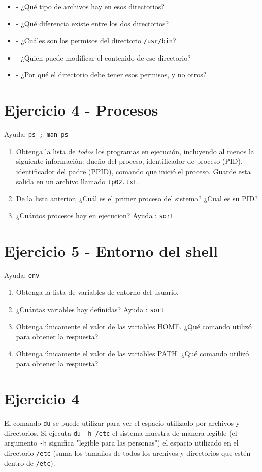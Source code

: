 \documentclass[12pt]{article}
\begin{document}
\begin{itemize}
\item - ¿Qué tipo de archivos hay en esos directorios?
\item - ¿Qué diferencia existe entre los dos directorios?
\item - ¿Cuáles son los permisos del directorio \texttt{/usr/bin}?
\item - ¿Quien puede modificar el contenido de ese directorio?
\item - ¿Por qué el directorio debe tener esos permisos, y no otros?
\end{itemize}


\section*{Ejercicio 4 - Procesos}
Ayuda: \texttt{ps ; man ps}
\begin{enumerate}
\item Obtenga la lista de \textit{todos} los programas en ejecución, incluyendo al menos la siguiente información:
dueño del proceso, identificador de proceso (PID), identificador del padre (PPID),
comando que inició el proceso. Guarde esta salida en un archivo llamado \texttt{tp02.txt}.
\item De la lista anterior, ¿Cuál es el primer proceso del sistema? ¿Cual es su PID?
\item ¿Cuántos procesos hay en ejecucion? Ayuda : \texttt{sort}
\end{enumerate}

\section*{Ejercicio 5 - Entorno del shell}
Ayuda: \texttt{env}
\begin{enumerate}
\item Obtenga la lista de variables de entorno del usuario.
\item ¿Cuántas variables hay definidas? Ayuda : \texttt{sort}
\item Obtenga únicamente el valor de las variables HOME. ¿Qué comando utilizó para obtener la respuesta?
\item Obtenga únicamente el valor de las variables PATH. ¿Qué comando utilizó para obtener la respuesta?
\end{enumerate}



\section*{Ejercicio 4}
El comando \texttt{du} se puede utilizar para ver el espacio utilizado por archivos y directorios.
Si ejecuta \texttt{du -h /etc} el sistema muestra de manera legible (el argumento \texttt{-h} significa "legible para las personas")
el espacio utilizado en el directorio \texttt{/etc} (suma los tamaños de todos los archivos y directorios que estén dentro de \texttt{/etc}).
\end{document}
